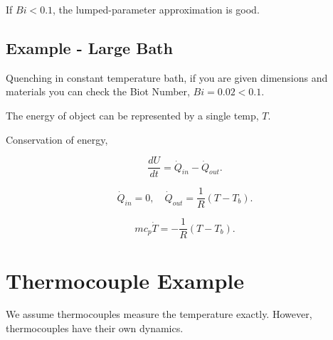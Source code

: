 \documentclass[12pt, a4paper]{report}
\begin{document}
  If $ Bi < 0.1 $, the lumped-parameter approximation is good.

  \subsection{Example - Large Bath}

  Quenching in constant temperature bath, if you are given dimensions and materials you can check the Biot Number, $ Bi = 0.02 < 0.1. $

  The energy of object can be represented by a single temp, $ T. $

  Conservation of energy,

  \[
      \frac{dU}{dt} = \dot Q_{in} - \dot Q_{out}
    .\]

  \[
      \dot Q_{in} = 0, \quad \dot Q_{out} = \frac{1}{R}(T - T_b)
    .\]

  \[
      mc_p\dot T = -\frac{1}{R}(T - T_b)
    .\]

  \section{Thermocouple Example}

  We assume thermocouples measure the temperature exactly. However, thermocouples have their own dynamics.
\end{document}
